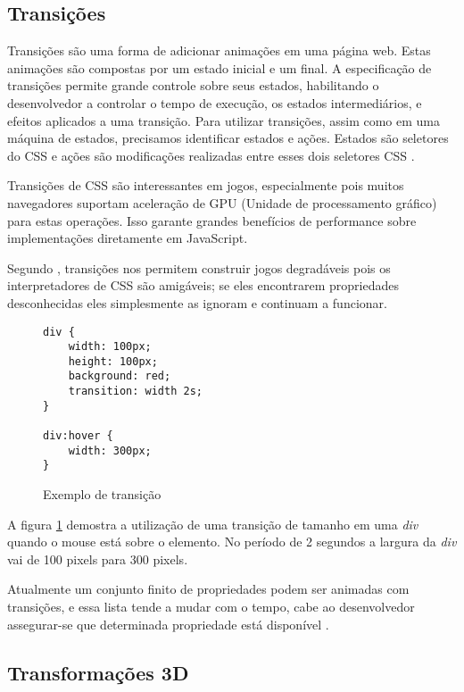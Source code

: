 \subsection{Transições}

Transições são uma forma de adicionar animações em uma página
web. Estas animações são compostas por um estado inicial e um final.
A especificação de transições permite grande controle sobre seus
estados, habilitando o desenvolvedor a controlar o tempo de execução,
os estados intermediários, e efeitos aplicados a uma transição.
Para utilizar transições, assim como em uma máquina de estados,
precisamos identificar estados e ações. Estados são seletores do CSS
e ações são modificações realizadas entre esses dois seletores CSS
\autocite{html5mostwanted}.

Transições de CSS são interessantes em jogos, especialmente pois muitos
navegadores suportam aceleração de GPU (Unidade de processamento
gráfico) para estas operações. Isso garante grandes benefícios de
performance sobre implementações diretamente em JavaScript.

Segundo \citet{html5mostwanted}, transições nos permitem construir jogos
degradáveis pois os interpretadores de CSS são amigáveis; se eles
encontrarem propriedades desconhecidas eles simplesmente as ignoram e
continuam a funcionar.

\begin{figure}[H]
\centering
\begin{verbatim}
div {
    width: 100px;
    height: 100px;
    background: red;
    transition: width 2s;
}

div:hover {
    width: 300px;
}

\end{verbatim}
\caption{Exemplo de transição}
\label{fig:CSSTransition}
\end{figure}

A figura \ref{fig:CSSTransition} demostra a utilização de uma
transição de tamanho em uma \textit{div} quando o mouse está sobre o
elemento. No período de 2 segundos a largura da \textit{div} vai de 100
pixels para 300 pixels.

Atualmente um conjunto finito de propriedades podem ser animadas
com transições, e essa lista tende a mudar com o tempo, cabe ao
desenvolvedor assegurar-se que determinada propriedade está disponível
\autocite{mdnTransitions}.

\subsection{Transformações 3D}

